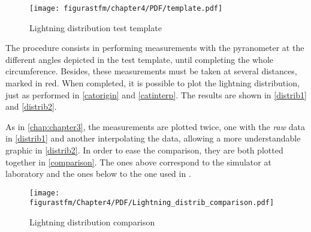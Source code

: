 \begin{figure}[H]
			\centering
			\texttt{[image: figurastfm/chapter4/PDF/template.pdf]}
			\caption{Lightning distribution test template} \label{plantillacanon}
			\vspace{-0.7cm}
\end{figure}

The procedure consists in performing measurements with the pyranometer at the different angles depicted in the test template, until completing the whole circumference. Besides, these measurements must be taken at several distances, marked in red. When completed, it is possible to plot the lightning distribution, just as performed in \autoref{catorigin} and \autoref{catinterp}. The results are shown in \autoref{distrib1} and \autoref{distrib2}.

	
	

As in \autoref{chap:chapter3}, the measurements are plotted twice, one with the \textit{raw} data in \autoref{distrib1} and another interpolating the data, allowing a more understandable graphic in \autoref{distrib2}. In order to ease the comparison, they are both plotted together in \autoref{comparison}. The ones above correspond to the simulator at  laboratory and the ones below to the one used in \cite{catalan}.

\begin{figure}
			\centering
			\texttt{[image: figurastfm/Chapter4/PDF/Lightning\_distrib\_comparison.pdf]}
			\caption{Lightning distribution comparison} \label{comparison}
\end{figure}

